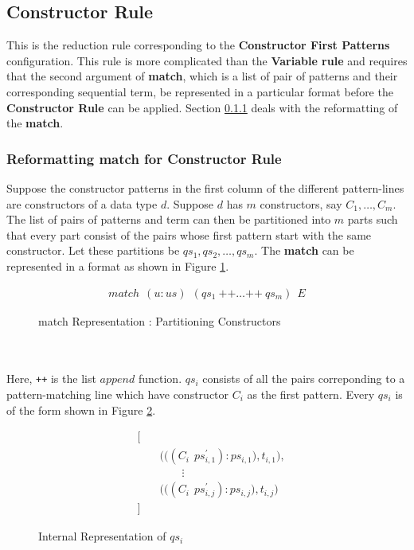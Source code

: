 \documentclass[11pt]{article}
\begin{document}
\subsection {Constructor Rule}
This is the reduction rule corresponding to the {\bf Constructor First Patterns} configuration. This rule is more complicated than the {\bf Variable rule} and requires that the second argument of {\bf match}, which is a list of pair of patterns and their corresponding sequential term, be represented in a particular format before the {\bf Constructor Rule} can be applied. Section \ref {pmatch:reformatConsRule} deals with the reformatting of the {\bf match}.

\subsubsection {Reformatting match for Constructor Rule}\label{pmatch:reformatConsRule}
Suppose the constructor patterns in the first column of the different pattern-lines are constructors of a data type $d$. Suppose $d$ has $m$ constructors, say $C_1,\ldots,C_m$. The list of pairs of patterns and term can then be partitioned into $m$ parts such that every part consist of the pairs whose first pattern start with the same constructor. Let these partitions be $qs_1,qs_2,\ldots,qs_m$. The {\bf match} can be represented in a format as shown in Figure \ref {fig:Pmatch_PartCons}.
\begin{figure}
\begin{align*}
  match~~(u:us)~~(qs_1 ~ \texttt{++} \ldots \texttt{++}~qs_m)~~ E
\end{align*}
\caption{match Representation : Partitioning Constructors} \label{fig:Pmatch_PartCons}
\end{figure}
~~\\~~\\
Here, \texttt{++} is the list $append$ function. $qs_i$ consists of all the pairs correponding to a pattern-matching line which have constructor $C_i$ as the first pattern. Every $qs_i$ is of the form shown in Figure \ref {fig:PMatch_QsForm}.
\begin{figure}
\begin{align*}
&\bigg[\\
&\qquad \bigg(\Big((C_i~~ps_{i,1}^{\prime}):ps_{i,1}\Big),t_{i,1}\bigg), \\ 
&\qquad \qquad \vdots \\
&\qquad \bigg(\Big((C_i~~ps_{i,j}^{\prime}):ps_{i,j}\Big),t_{i,j}\bigg) \\ 
&\bigg]
\end{align*}
\caption{Internal Representation of $qs_i$} \label{fig:PMatch_QsForm}
\end{figure}
\end{document}
